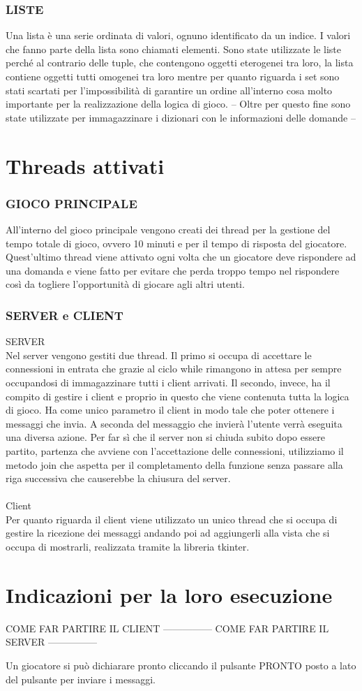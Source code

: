 \documentclass[a4paper,12pt]{report}
\begin{document}
\subsection{LISTE} 
Una lista è una serie ordinata di valori, ognuno identificato da un indice. I valori che fanno parte della lista sono chiamati elementi.
Sono state utilizzate le liste perché al contrario delle tuple, che contengono oggetti eterogenei tra loro, la lista contiene oggetti tutti omogenei tra loro mentre per quanto riguarda i set sono stati scartati per l'impossibilità di garantire un ordine all'interno cosa molto importante per la realizzazione della logica di gioco.
-- Oltre per questo fine sono state utilizzate per immagazzinare i dizionari con le informazioni delle domande --

\chapter{Threads attivati}
\subsection{GIOCO PRINCIPALE}
All'interno del gioco principale vengono creati dei thread per la gestione del tempo totale di gioco, ovvero 10 minuti e per il tempo di risposta del giocatore. Quest'ultimo thread viene attivato ogni volta che un giocatore deve rispondere ad una domanda e viene fatto per evitare che perda troppo tempo nel rispondere così da togliere l'opportunità di giocare agli altri utenti.

\subsection{SERVER e CLIENT}
SERVER\\
Nel server vengono gestiti due thread. 
Il primo si occupa di accettare le connessioni in entrata che grazie al ciclo while rimangono in attesa per sempre occupandosi di immagazzinare tutti i client arrivati.
Il secondo, invece, ha il compito di gestire i client e proprio in questo che viene contenuta tutta la logica di gioco. Ha come unico parametro il client in modo tale che poter ottenere i messaggi che invia. A seconda del messaggio che invierà l'utente verrà eseguita una diversa azione.
Per far sì che il server non si chiuda subito dopo essere partito, partenza che avviene con l'accettazione delle connessioni, utilizziamo il metodo join che aspetta per il completamento della funzione senza passare alla riga successiva che causerebbe la chiusura del server.\\
\\
Client\\
Per quanto riguarda il client viene utilizzato un unico thread che si occupa di gestire la ricezione dei messaggi andando poi ad aggiungerli alla vista che si occupa di mostrarli, realizzata tramite la libreria tkinter.

\chapter{Indicazioni per la loro esecuzione}
COME FAR PARTIRE IL CLIENT
---------------
COME FAR PARTIRE IL SERVER
---------------

Un giocatore si può dichiarare pronto cliccando il pulsante PRONTO posto a lato del pulsante per inviare i messaggi.
\end{document}
